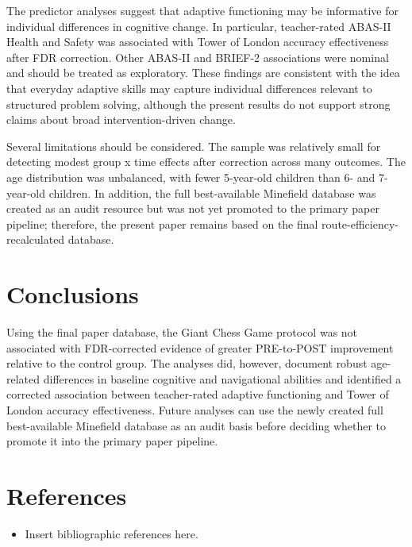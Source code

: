 \documentclass[
  letterpaper,
  DIV=11,
  numbers=noendperiod]{scrartcl}
\providecommand{\tightlist}{%
  \setlength{\itemsep}{0pt}\setlength{\parskip}{0pt}}
\begin{document}
The predictor analyses suggest that adaptive functioning may be
informative for individual differences in cognitive change. In
particular, teacher-rated ABAS-II Health and Safety was associated with
Tower of London accuracy effectiveness after FDR correction. Other
ABAS-II and BRIEF-2 associations were nominal and should be treated as
exploratory. These findings are consistent with the idea that everyday
adaptive skills may capture individual differences relevant to
structured problem solving, although the present results do not support
strong claims about broad intervention-driven change.

Several limitations should be considered. The sample was relatively
small for detecting modest group x time effects after correction across
many outcomes. The age distribution was unbalanced, with fewer
5-year-old children than 6- and 7-year-old children. In addition, the
full best-available Minefield database was created as an audit resource
but was not yet promoted to the primary paper pipeline; therefore, the
present paper remains based on the final route-efficiency-recalculated
database.

\section{Conclusions}\label{conclusions}

Using the final paper database, the Giant Chess Game protocol was not
associated with FDR-corrected evidence of greater PRE-to-POST
improvement relative to the control group. The analyses did, however,
document robust age-related differences in baseline cognitive and
navigational abilities and identified a corrected association between
teacher-rated adaptive functioning and Tower of London accuracy
effectiveness. Future analyses can use the newly created full
best-available Minefield database as an audit basis before deciding
whether to promote it into the primary paper pipeline.

\section{References}\label{references}

\begin{itemize}
\tightlist
\item
  Insert bibliographic references here.
\end{itemize}
\end{document}
